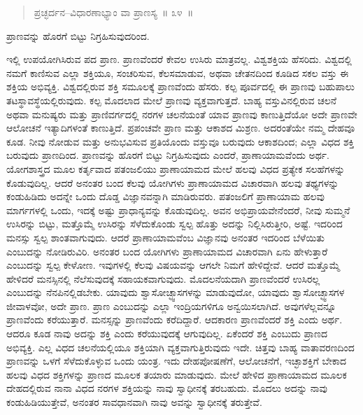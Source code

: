 \eject


\begin{verse}
ಪ್ರಚ್ಛರ್ದನ–ವಿಧಾರಣಾಭ್ಯಾಂ ವಾ ಪ್ರಾಣಸ್ಯ~॥ ೩೪~॥
\end{verse}

\vspace{-0.4cm}

ಪ್ರಾಣವನ್ನು ಹೊರಗೆ ಬಿಟ್ಟು ನಿಗ್ರಹಿಸುವುದರಿಂದ. 

ಇಲ್ಲಿ ಉಪಯೋಗಿಸಿರುವ ಪದ ಪ್ರಾಣ. ಪ್ರಾಣವೆಂದರೆ ಕೇವಲ ಉಸಿರು ಮಾತ್ರವಲ್ಲ. ವಿಶ್ವಶಕ್ತಿಯ ಹೆಸರಿದು. ವಿಶ್ವದಲ್ಲಿ ನಮಗೆ ಕಾಣಿಸುವ ಎಲ್ಲಾ ಶಕ್ತಿಯೂ, ಸಂಚರಿಸುವ, ಕೆಲಸಮಾಡುವ, ಅಥವಾ ಚೇತನದಿಂದ ಕೂಡಿದ ಸಕಲ ವಸ್ತು ಈ ಶಕ್ತಿಯ ಅಭಿವ್ಯಕ್ತಿ. ವಿಶ್ವದಲ್ಲಿರುವ ಶಕ್ತಿ ಸಮೂಲಕ್ಕೆ ಪ್ರಾಣವೆಂದು ಹೆಸರು. ಕಲ್ಪ ಪೂರ್ವದಲ್ಲಿ ಈ ಪ್ರಾಣವು ಬಹುಪಾಲು ತಟಸ್ಥಾವಸ್ಥೆಯಲ್ಲಿರುವುದು. ಕಲ್ಪ ಮೊದಲಾದ ಮೇಲೆ ಪ್ರಾಣವು ವ್ಯಕ್ತವಾಗುತ್ತದೆ. ಬಾಹ್ಯ ವಸ್ತುವಿನಲ್ಲಿರುವ ಚಲನೆ ಅಥವಾ ಮನುಷ್ಯರು ಮತ್ತು ಪ್ರಾಣಿವರ್ಗದಲ್ಲಿ ನರಗಳ ಚಲನೆಯಂತೆ ಯಾವ ಪ್ರಾಣವು ಕಾಣುತ್ತಿದೆಯೋ ಅದೇ ಪ್ರಾಣವೇ ಆಲೋಚನೆ ಇತ್ಯಾದಿಗಳಂತೆ ಕಾಣುತ್ತಿದೆ. ಪ್ರಪಂಚವೇ ಪ್ರಾಣ ಮತ್ತು ಆಕಾಶದ ಮಿಶ್ರಣ. ಅದರಂತೆಯೇ ನಮ್ಮ ದೇಹವೂ ಕೂಡ. ನೀವು ನೋಡುವ ಮತ್ತು ಅನುಭವಿಸುವ ಪ್ರತಿಯೊಂದು ವಸ್ತುವೂ ಬರುವುದು ಆಕಾಶದಿಂದ; ಎಲ್ಲಾ ವಿಧದ ಶಕ್ತಿ ಬರುವುದು ಪ್ರಾಣದಿಂದ. ಪ್ರಾಣವನ್ನು ಹೊರಗೆ ಬಿಟ್ಟು ನಿಗ್ರಹಿಸುವುದು ಎಂದರೆ, ಪ್ರಾಣಾಯಾಮವೆಂದು ಅರ್ಥ. ಯೋಗಶಾಸ್ತ್ರದ ಮೂಲ ಕರ್ತೃವಾದ ಪತಂಜಲಿಯು ಪ್ರಾಣಾಯಾಮದ ಮೇಲೆ ಹಲವು ವಿಧದ ಪ್ರತ್ಯೇಕ ಸಲಹೆಗಳನ್ನು ಕೊಡುವುದಿಲ್ಲ. ಆದರೆ ಅನಂತರ ಬಂದ ಕೆಲವು ಯೋಗಿಗಳು ಪ್ರಾಣಾಯಾಮದ ವಿಚಾರವಾಗಿ ಹಲವು ತಥ್ಯಗಳನ್ನು ಕಂಡುಹಿಡಿದು ಅದನ್ನೇ ಒಂದು ದೊಡ್ಡ ವಿಜ್ಞಾನವನ್ನಾಗಿ ಮಾಡಿರುವರು. ಪತಂಜಲಿಗೆ ಪ್ರಾಣಾಯಾಮ ಹಲವು ಮಾರ್ಗಗಳಲ್ಲಿ ಒಂದು, ಇದಕ್ಕೆ ಅಷ್ಟು ಪ್ರಾಧಾನ್ಯವನ್ನು ಕೊಡುವುದಿಲ್ಲ. ಅವನ ಅಭಿಪ್ರಾಯವೇನೆಂದರೆ, ನೀವು ಸುಮ್ಮನೆ ಉಸಿರನ್ನು ಬಿಟ್ಟು, ಮತ್ತೊಮ್ಮೆ ಉಸಿರನ್ನು ಸೆಳೆದುಕೊಂಡು ಸ್ವಲ್ಪ ಹೊತ್ತು ಅದನ್ನು ನಿಲ್ಲಿಸಿರುತ್ತೀರಿ, ಅಷ್ಟೆ. ಇದರಿಂದ ಮನಸ್ಸು ಸ್ವಲ್ಪ ಶಾಂತವಾಗುವುದು. ಆದರೆ ಪ್ರಾಣಾಯಾಮವೆಂಬ ವಿಜ್ಞಾನವು ಅನಂತರ ಇದರಿಂದ ಬೆಳೆಯಿತು ಎಂಬುದನ್ನು ನೋಡಿರುವಿರಿ. ಅನಂತರ ಬಂದ ಯೋಗಿಗಳು ಪ್ರಾಣಾಯಾಮದ ವಿಚಾರವಾಗಿ ಏನು ಹೇಳುತ್ತಾರೆ ಎಂಬುದನ್ನು ಸ್ವಲ್ಪ ಕೇಳೋಣ. ಇವುಗಳಲ್ಲಿ ಕೆಲವು ವಿಷಯವನ್ನು ಆಗಲೇ ನಿಮಗೆ ಹೇಳಿದ್ದೇವೆ. ಆದರೆ ಮತ್ತೊಮ್ಮೆ ಹೇಳಿದರೆ ಮನಸ್ಸಿನಲ್ಲಿ ನೆಲೆಸುವುದಕ್ಕೆ ಸಹಾಯಕವಾಗುವುದು. ಮೊದಲನೆಯದಾಗಿ ಪ್ರಾಣವೆಂದರೆ ಉಸಿರಲ್ಲ ಎಂಬುದನ್ನು ನೆನಪಿನಲ್ಲಿಡಬೇಕು. ಯಾವುದು ಶ್ವಾಸೋಚ್ಛ್ವಾಸಗಳನ್ನು ಮಾಡುವುದೋ, ಯಾವುದು ಶ್ವಾಸೋಚ್ಛ್ವಾಸಗಳ ಜೀವಾಳವೋ, ಅದೇ ಪ್ರಾಣ. ಪ್ರಾಣ ಎಂಬುದನ್ನು ಎಲ್ಲಾ ಇಂದ್ರಿಯಗಳಿಗೂ ಅನ್ವಯಿಸಲಾಗಿದೆ. ಅವುಗಳೆಲ್ಲವನ್ನೂ ಪ್ರಾಣವೆಂದು ಕರೆಯುತ್ತಾರೆ. ಮನಸ್ಸನ್ನು ಪ್ರಾಣವೆಂದು ಕರೆದಿದ್ದಾರೆ. ಆದಕಾರಣ ಪ್ರಾಣವೆಂದರೆ ಶಕ್ತಿ ಎಂದು ಅರ್ಥ. ಆದರೂ ಕೂಡ ನಾವು ಅದನ್ನು ಶಕ್ತಿ ಎಂದು ಕರೆಯುವುದಕ್ಕೆ ಆಗುವುದಿಲ್ಲ. ಏಕೆಂದರೆ ಶಕ್ತಿ ಎಂಬುದು ಪ್ರಾಣದ ಅಭಿವ್ಯಕ್ತಿ. ಎಲ್ಲ ವಿಧದ ಚಲನೆಯಲ್ಲಿಯೂ ಶಕ್ತಿಯಾಗಿ ವ್ಯಕ್ತವಾಗುತ್ತಿರುವುದು ಇದೇ. ಚಿತ್ತವು ಬಾಹ್ಯ ವಾತಾವರಣದಿಂದ ಪ್ರಾಣವನ್ನು ಒಳಗೆ ಸೆಳೆದುಕೊಳ್ಳುವ ಒಂದು ಯಂತ್ರ. ಇದು ದೇಹಪೋಷಣೆಗೆ, ಆಲೋಚನೆಗೆ, ಇಚ್ಛಾಶಕ್ತಿಗೆ ಬೇಕಾದ ಹಲವು ವಿಧದ ಶಕ್ತಿಗಳನ್ನು ಪ್ರಾಣದ ಮೂಲಕ ತಯಾರು ಮಾಡುವುದು. ಮೇಲೆ ಹೇಳಿದ ಪ್ರಾಣಾಯಾಮದ ಮೂಲಕ ದೇಹದಲ್ಲಿರುವ ನಾನಾ ವಿಧದ ನರಗಳ ಶಕ್ತಿಯನ್ನು ನಾವು ಸ್ವಾಧೀನಕ್ಕೆ ತರಬಹುದು. ಮೊದಲು ಅದನ್ನು ನಾವು ಕಂಡುಹಿಡಿಯುತ್ತೇವೆ, ಅನಂತರ ಸಾವಧಾನವಾಗಿ ನಾವು ಅವನ್ನು ಸ್ವಾಧೀನಕ್ಕೆ ತರುತ್ತೇವೆ. 

